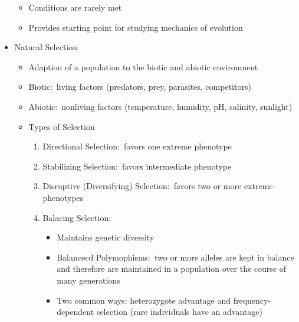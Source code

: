 \documentclass[12pt]{article}
\begin{document}
\begin{itemize}
\begin{itemize}
            \item Conditions are rarely met
            \item Provides starting point for studying mechanics of evolution
        \end{itemize}
        \item Natural Selection
        \begin{itemize}
            \item Adaption of a population to the biotic and abiotic environment
            \item Biotic:\ living factors (predators, prey, parasites, competitors)
            \item Abiotic:\ nonliving factors (temperature, humidity, pH, salinity, sunlight)
            \item Types of Selection
            \begin{enumerate}
                \item Directional Selection:\ favors one extreme phenotype
                \item Stabilizing Selection:\ favors intermediate phenotype
                \item Disruptive (Diversifying) Selection:\ favors two or more extreme phenotypes
                \item Balacing Selection:
                \begin{itemize}
                    \item Maintains genetic diversity
                    \item Balancecd Polymophisms:\ two or more alleles are kept in balance and therefore are maintained in a population over the course of many generations
                    \item Two common ways: heterozygote advantage and frequency-dependent selection (rare individuals have an advantage)
                \end{itemize}
            \end{enumerate}
        \end{itemize}
    \end{itemize}
\end{document}
